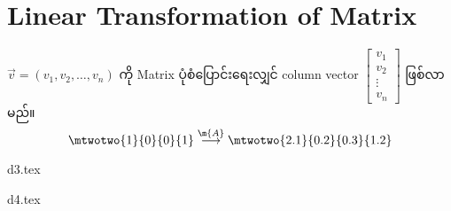 \section{Linear Transformation of Matrix}
$\vec{v}=(v_1,v_2,\dots,v_n)$ ကို Matrix ပုံစံပြောင်းရေးလျှင် column vector $\begin{bmatrix}
    v_1 \\ v_2 \\ \vdots \\ v_n
\end{bmatrix}$ ဖြစ်လာမည်။ 
\[
    \mtwotwo{1}{0}{0}{1}\stackrel{\m{A}}{\longrightarrow}\mtwotwo{2.1}{0.2}{0.3}{1.2}
\]
\begin{minipage}{0.45\textwidth}
    \centering
    {d3.tex}
\end{minipage}
\hfill
\begin{minipage}{0.45\textwidth}
    \centering
    {d4.tex}
\end{minipage}